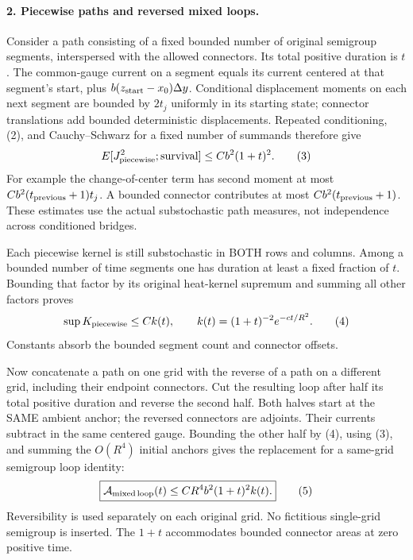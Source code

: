 \documentclass[11pt]{article}
\begin{document}
\paragraph{2. Piecewise paths and reversed mixed loops.}
Consider a path consisting of a fixed bounded number of original
semigroup segments, interspersed with the allowed connectors.
Its total positive duration is $t$.
The common-gauge current on a segment equals its current centered at
that segment's start, plus
$b(z_{\rm start}-x_0)\Delta y$.
Conditional displacement moments on each next segment are bounded by
$2t_j$ uniformly in its starting state; connector translations add
bounded deterministic displacements. Repeated conditioning, (2), and
Cauchy--Schwarz for a fixed number of summands therefore give
\[
 E[J_{\rm piecewise}^2;\text{survival}]
                      \le Cb^2(1+t)^2.                           \tag{3}
\]
For example the change-of-center term has second moment at most
$Cb^2(t_{\rm previous}+1)t_j$. A bounded connector contributes at most
$Cb^2(t_{\rm previous}+1)$. These estimates use the actual substochastic
path measures, not independence across conditioned bridges.

Each piecewise kernel is still substochastic in BOTH rows and columns.
Among a bounded number of time segments one has duration at least a
fixed fraction of $t$. Bounding that factor by its original heat-kernel
supremum and summing all other factors proves
\[
 \sup K_{\rm piecewise}\le C k(t),\qquad
 k(t)=(1+t)^{-2}e^{-ct/R^2}.                                      \tag{4}
\]
Constants absorb the bounded segment count and connector offsets.

Now concatenate a path on one grid with the reverse of a path on a
different grid, including their endpoint connectors. Cut the resulting
loop after half its total positive duration and reverse the second
half. Both halves start at the SAME ambient anchor; the reversed
connectors are adjoints. Their currents subtract in the same centered
gauge. Bounding the other half by (4), using (3), and summing the
$O(R^4)$ initial anchors gives the replacement for a same-grid
semigroup loop identity:
\[
 \boxed{\mathcal A_{\rm mixed\,loop}(t)
       \le C R^4 b^2(1+t)^2 k(t).}                               \tag{5}
\]
Reversibility is used separately on each original grid. No fictitious
single-grid semigroup is inserted. The $1+t$ accommodates bounded
connector areas at zero positive time.
\end{document}
